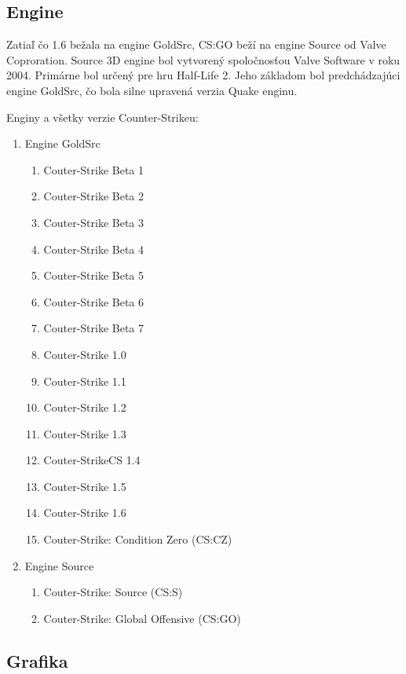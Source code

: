 \documentclass[10pt,oneside,slovak,a4paper]{article}
\begin{document}
\subsection{Engine} \label{porovnanie:engine}
Zatiaľ čo 1.6 bežala na engine GoldSrc, CS:GO beží na engine Source od Valve Coproration. Source 3D engine bol vytvorený spoločnosťou Valve Software v roku 2004. Primárne bol určený pre hru Half-Life 2. Jeho základom bol predchádzajúci engine GoldSrc, čo bola silne upravená verzia Quake enginu.
 


Enginy a všetky verzie Counter-Strikeu:
\begin{enumerate}
\item Engine GoldSrc
	\begin{enumerate}
	\item Couter-Strike Beta 1
	\item Couter-Strike Beta 2
	\item Couter-Strike Beta 3
	\item Couter-Strike Beta 4
	\item Couter-Strike Beta 5
	\item Couter-Strike Beta 6
	\item Couter-Strike Beta 7
	\item Couter-Strike 1.0
	\item Couter-Strike 1.1
	\item Couter-Strike 1.2
	\item Couter-Strike 1.3
	\item Couter-StrikeCS 1.4
	\item Couter-Strike 1.5
	\item Couter-Strike 1.6
	\item Couter-Strike: Condition Zero (CS:CZ)
	\end{enumerate}
\item Engine Source
	\begin{enumerate}
	\item Couter-Strike: Source (CS:S)
	\item Couter-Strike: Global Offensive (CS:GO)
	\end{enumerate}
\end{enumerate}



\subsection{Grafika} \label{porovnanie:grafika}
\end{document}

